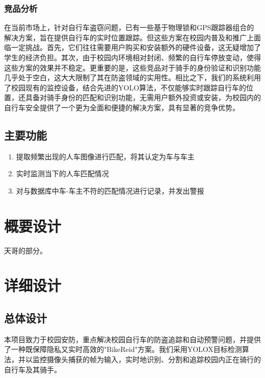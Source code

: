 \documentclass{article}
\begin{document}
\subsubsection{竞品分析}

在当前市场上，针对自行车盗窃问题，已有一些基于物理锁和GPS跟踪器组合的解决方案，旨在提供自行车的实时位置跟踪。但这些方案在校园内普及和推广上面临一定挑战。首先，它们往往需要用户购买和安装额外的硬件设备，这无疑增加了学生的经济负担。其次，由于校园内环境相对封闭、频繁的自行车停放变动，使得这些方案的效果并不稳定。更重要的是，这些竞品对于骑手的身份验证和识别功能几乎处于空白，这大大限制了其在防盗领域的实用性。相比之下，我们的系统利用了校园现有的监控设备，结合先进的YOLO算法，不仅能够实时跟踪自行车的位置，还具备对骑手身份的匹配和识别功能，无需用户额外投资或安装，为校园内的自行车安全提供了一个更为全面和便捷的解决方案，具有显著的竞争优势。

\subsection{主要功能}

\begin{enumerate}
   \item 提取频繁出现的人车图像进行匹配，将其认定为车与车主
   \item 实时监测当下的人车匹配情况
   \item 对与数据库中车-车主不符的匹配情况进行记录，并发出警报
\end{enumerate}

\section{概要设计}

天哥的部分。

\section{详细设计}

\subsection{总体设计}
本项目致力于校园安防，重点解决校园自行车的防盗追踪和自动预警问题，并提供了一种既保障隐私又实时高效的"BikeReid"方案。我们采用YOLOX目标检测算法，并以监控摄像头捕获的帧为输入，实时地识别、分割和追踪校园内正在骑行的自行车及其骑手。\\
\end{document}
